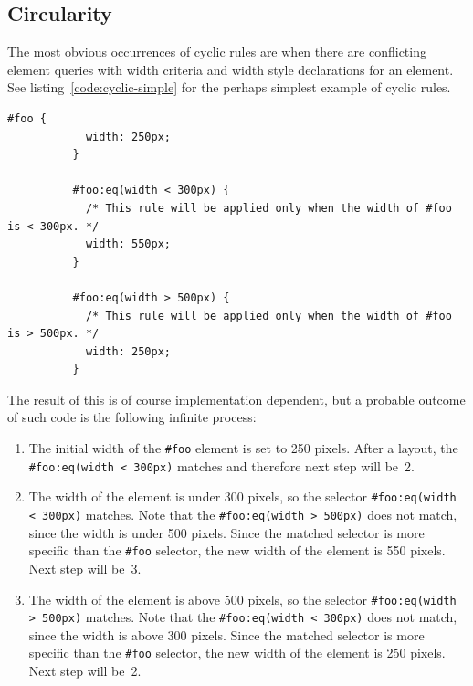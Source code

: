 \documentclass[a4paper,11pt]{kth-mag}
\newcommand{\code}[1]{\texttt{#1}}
\begin{document}
      \subsection{Circularity}\label{sec:cyclic-rules}
        The most obvious occurrences of cyclic rules are when there are conflicting element queries with width criteria and width style declarations for an \gls{element}.
        See listing~\ref{code:cyclic-simple} for the perhaps simplest example of cyclic rules.
        \begin{lstlisting}[gobble=10,caption={Simple example of cyclic rules with directly conflicting width element queries criteria and declarations. Recall the element queries psuedo syntax defined in Section~\ref{sec:eq-definitions}.}, captionpos=b, label={code:cyclic-simple}]
          #foo {
            width: 250px;
          }

          #foo:eq(width < 300px) {
            /* This rule will be applied only when the width of #foo is < 300px. */
            width: 550px;
          }

          #foo:eq(width > 500px) {
            /* This rule will be applied only when the width of #foo is > 500px. */
            width: 250px;
          }
        \end{lstlisting}
        The result of this is of course implementation dependent, but a probable outcome of such code is the following infinite process:
        \begin{enumerate}
          \item 
            The initial width of the \code{\#foo} \gls{element} is set to 250 pixels.
            After a layout, the \code{\#foo:eq(width < 300px)} matches and therefore next step will be~2.
          \item 
            The width of the \gls{element} is under 300 pixels, so the selector \code{\#foo:eq(width < 300px)} matches.
            Note that the \code{\#foo:eq(width > 500px)} does not match, since the width is under 500 pixels.
            Since the matched selector is more specific than the \code{\#foo} selector, the new width of the \gls{element} is 550 pixels.
            Next step will be~3.
          \item 
            The width of the \gls{element} is above 500 pixels, so the selector \code{\#foo:eq(width > 500px)} matches.
            Note that the \code{\#foo:eq(width < 300px)} does not match, since the width is above 300 pixels.
            Since the matched selector is more specific than the \code{\#foo} selector, the new width of the \gls{element} is 250 pixels.
            Next step will be~2.
        \end{enumerate}
\end{document}
